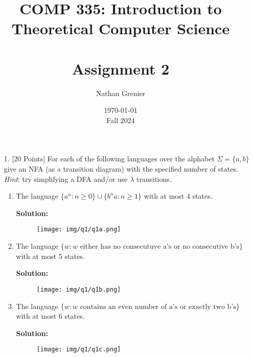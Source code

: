 \documentclass[12pt]{article}
\title{COMP 335: Introduction to Theoretical Computer Science\\
\ \\
Assignment 2}
\author{Nathan Grenier}
\date{\today \\ Fall 2024}
\begin{document}
\begin{spacing}{1.5}
      \maketitle

      \newpage

      \begin{enumerate}

            \item[1.] [20 Points] For each of the following languages over the alphabet $\Sigma = \{a,b\}$ give an NFA (as a transition diagram) with the specified number of states. \emph{Hint}: try simplifying a DFA and/or use $\lambda$ transitions.

                  \begin{enumerate}
                        \item The language $\{a^n : n \geq 0 \} \cup \{b^na : n \geq 1 \}$ with at most 4 states.

                              \textbf{Solution:}

                              \begin{figure}[h!]
                                    \centering
                                    \texttt{[image: img/q1/q1a.png]}
                              \end{figure}

                        \item The language $\{w : w \text{ either has no consecutuve a's or no consecutive b's} \}$ with at most 5 states.

                              \textbf{Solution:}

                              \begin{figure}[h!]
                                    \centering
                                    \texttt{[image: img/q1/q1b.png]}
                              \end{figure}

                              \newpage

                        \item The language $\{w : w \text{ contains an even number of a's or exactly two b's} \}$ with at most 6 states.

                              \textbf{Solution:}

                              \begin{figure}[h!]
                                    \centering
                                    \texttt{[image: img/q1/q1c.png]}
                              \end{figure}


\end{enumerate}
\end{enumerate}
\end{spacing}
\end{document}
